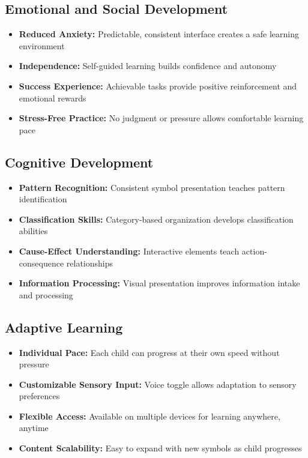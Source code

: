 \documentclass[12pt,a4paper]{article}
\begin{document}
\subsection{Emotional and Social Development}
\begin{itemize}[leftmargin=*]
    \item \textbf{Reduced Anxiety:} Predictable, consistent interface creates a safe learning environment
    \item \textbf{Independence:} Self-guided learning builds confidence and autonomy
    \item \textbf{Success Experience:} Achievable tasks provide positive reinforcement and emotional rewards
    \item \textbf{Stress-Free Practice:} No judgment or pressure allows comfortable learning pace
\end{itemize}

\subsection{Cognitive Development}
\begin{itemize}[leftmargin=*]
    \item \textbf{Pattern Recognition:} Consistent symbol presentation teaches pattern identification
    \item \textbf{Classification Skills:} Category-based organization develops classification abilities
    \item \textbf{Cause-Effect Understanding:} Interactive elements teach action-consequence relationships
    \item \textbf{Information Processing:} Visual presentation improves information intake and processing
\end{itemize}

\subsection{Adaptive Learning}
\begin{itemize}[leftmargin=*]
    \item \textbf{Individual Pace:} Each child can progress at their own speed without pressure
    \item \textbf{Customizable Sensory Input:} Voice toggle allows adaptation to sensory preferences
    \item \textbf{Flexible Access:} Available on multiple devices for learning anywhere, anytime
    \item \textbf{Content Scalability:} Easy to expand with new symbols as child progresses
\end{itemize}
\end{document}
